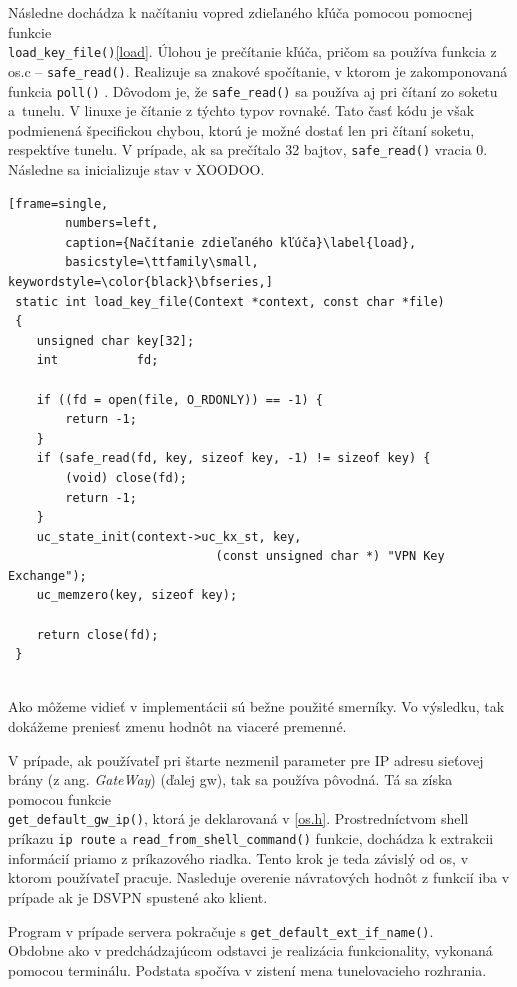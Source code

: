  Následne dochádza k načítaniu vopred zdieľaného kľúča pomocou pomocnej funkcie 
\\
 \lstinline|load_key_file()|\ref{load}. Úlohou je prečítanie kľúča, pričom sa používa funkcia z os.c -- \lstinline|safe_read()|. Realizuje sa znakové spočítanie, v ktorom je zakomponovaná funkcia  \lstinline|poll()| \cite{poll}. Dôvodom je, že \lstinline|safe_read()| sa používa aj pri čítaní zo soketu a~tunelu. V linuxe je čítanie z týchto typov rovnaké. Tato časť kódu je však podmienená špecifickou chybou, ktorú je možné dostať len pri čítaní soketu, respektíve tunelu.  
 V prípade, ak sa prečítalo 32 bajtov, \lstinline|safe_read()| vracia 0. Následne sa inicializuje stav v XOODOO.
 
 \begin{minipage}{\linewidth} 	
 	\begin{lstlisting}[frame=single,
 		numbers=left,
 		caption={Načítanie zdieľaného kľúča}\label{load},
 		basicstyle=\ttfamily\small, keywordstyle=\color{black}\bfseries,]
 static int load_key_file(Context *context, const char *file)
 {
 	unsigned char key[32];
 	int           fd;
 	
 	if ((fd = open(file, O_RDONLY)) == -1) {
 		return -1;
 	}
 	if (safe_read(fd, key, sizeof key, -1) != sizeof key) {
 		(void) close(fd);
 		return -1;
 	}
 	uc_state_init(context->uc_kx_st, key, 
 							 (const unsigned char *) "VPN Key Exchange");
 	uc_memzero(key, sizeof key);
 	
 	return close(fd);
 }
  	\end{lstlisting}
\end{minipage}\\ 
Ako môžeme vidieť v implementácii sú bežne použité smerníky. Vo výsledku, tak dokážeme preniesť zmenu hodnôt na viaceré premenné.
 
V prípade, ak používateľ pri štarte nezmenil parameter pre IP adresu sieťovej brány (z ang. \textit{GateWay}) (ďalej \acrshort{gw}), tak sa používa pôvodná. Tá sa získa pomocou funkcie \\\lstinline|get_default_gw_ip()|, ktorá je deklarovaná v \ref{os.h}. Prostredníctvom shell príkazu \lstinline|ip route| a \lstinline|read_from_shell_command()| funkcie, dochádza k extrakcii informácií priamo z príkazového riadka. Tento krok je teda závislý od \acrshort{os}, v ktorom používateľ pracuje. Nasleduje overenie návratových hodnôt z funkcií iba v prípade ak je DSVPN spustené ako klient.
 
Program v prípade servera pokračuje s \lstinline|get_default_ext_if_name()|. \\Obdobne ako v predchádzajúcom odstavci je realizácia funkcionality, vykonaná pomocou terminálu. Podstata spočíva v zistení mena tunelovacieho rozhrania.
 
